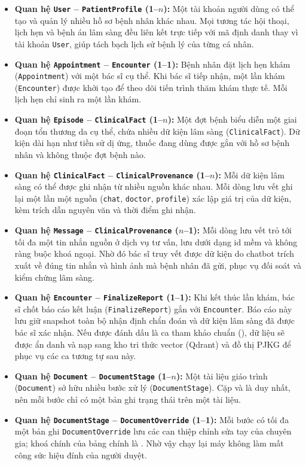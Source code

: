 \begin{itemize}
  \item \textbf{Quan hệ \texttt{User} -- \texttt{PatientProfile} (1--$n$):} Một tài khoản người dùng có thể tạo và quản lý nhiều hồ sơ bệnh nhân khác nhau. Mọi tương tác hội thoại, lịch hẹn và bệnh án lâm sàng đều liên kết trực tiếp với mã định danh  thay vì tài khoản \texttt{User}, giúp tách bạch lịch sử bệnh lý của từng cá nhân.
  \item \textbf{Quan hệ \texttt{Appointment} -- \texttt{Encounter} (1--1):} Bệnh nhân đặt lịch hẹn khám (\texttt{Appointment}) với một bác sĩ cụ thể. Khi bác sĩ tiếp nhận, một lần khám (\texttt{Encounter}) được khởi tạo để theo dõi tiến trình thăm khám thực tế. Mỗi lịch hẹn chỉ sinh ra một lần khám.
  \item \textbf{Quan hệ \texttt{Episode} -- \texttt{ClinicalFact} (1--$n$):} Một đợt bệnh biểu diễn một giai đoạn tổn thương da cụ thể, chứa nhiều dữ kiện lâm sàng (\texttt{ClinicalFact}). Dữ kiện dài hạn như tiền sử dị ứng, thuốc đang dùng được gắn với hồ sơ bệnh nhân và không thuộc đợt bệnh nào.
  \item \textbf{Quan hệ \texttt{ClinicalFact} -- \texttt{ClinicalProvenance} (1--$n$):} Mỗi dữ kiện lâm sàng có thể được ghi nhận từ nhiều nguồn khác nhau. Mỗi dòng lưu vết ghi lại một lần một nguồn (\texttt{chat}, \texttt{doctor}, \texttt{profile}) xác lập giá trị của dữ kiện, kèm trích dẫn nguyên văn và thời điểm ghi nhận.
  \item \textbf{Quan hệ \texttt{Message} -- \texttt{ClinicalProvenance} ($n$--1):} Mỗi dòng lưu vết trỏ tới tối đa một tin nhắn nguồn ở dịch vụ tư vấn, lưu dưới dạng id mềm và không ràng buộc khoá ngoại. Nhờ đó bác sĩ truy vết được dữ kiện do chatbot trích xuất về đúng tin nhắn và hình ảnh mà bệnh nhân đã gửi, phục vụ đối soát và kiểm chứng lâm sàng.
  \item \textbf{Quan hệ \texttt{Encounter} -- \texttt{FinalizeReport} (1--1):} Khi kết thúc lần khám, bác sĩ chốt báo cáo kết luận (\texttt{FinalizeReport}) gắn với \texttt{Encounter}. Báo cáo này lưu giữ snapshot toàn bộ nhận định chẩn đoán và dữ kiện lâm sàng đã được bác sĩ xác nhận. Nếu được đánh dấu là ca tham khảo chuẩn (), dữ liệu sẽ được ẩn danh và nạp sang kho tri thức vector (Qdrant) và đồ thị PJKG để phục vụ các ca tương tự sau này.
  \item \textbf{Quan hệ \texttt{Document} -- \texttt{DocumentStage} (1--$n$):} Một tài liệu giáo trình (\texttt{Document}) sở hữu nhiều bước xử lý (\texttt{DocumentStage}). Cặp  và  là duy nhất, nên mỗi bước chỉ có một bản ghi trạng thái trên một tài liệu.
  \item \textbf{Quan hệ \texttt{DocumentStage} -- \texttt{DocumentOverride} (1--1):} Mỗi bước có tối đa một bản ghi \texttt{DocumentOverride} lưu các can thiệp chỉnh sửa tay của chuyên gia; khoá chính của bảng chính là . Nhờ vậy chạy lại máy không làm mất công sức hiệu đính của người duyệt.
\end{itemize}

